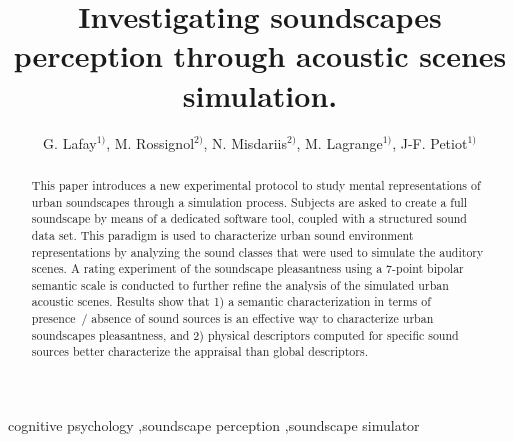 \documentclass[12pt]{elsarticle}
\begin{document}
\begin{frontmatter}


    \author{G. Lafay$^{1)}$, M. Rossignol$^{2)}$, N. Misdariis$^{2)}$, M. Lagrange$^{1)}$, J-F. Petiot$^{1)}$}

    \address{$^{1)}$ Laboratoire des Sciences du Numérique, Nantes, France.\\
    \hspace*{8pt}mathieu.lagrange@cnrs.fr\\
    $^{2)}$ STMS Ircam-CNRS-UPMC Institut de Recherche et Coordination Acoustique/Musique, Paris, France}


    \title{Investigating soundscapes perception through acoustic scenes simulation.}

  \begin{abstract}
    This paper introduces a new experimental protocol to study mental representations of urban soundscapes through a simulation process. Subjects are asked to create a full soundscape by means of a dedicated software tool, coupled with a structured sound data set. This paradigm is used to characterize urban sound environment representations by analyzing the sound classes that were used to simulate the auditory scenes. A rating experiment of the soundscape pleasantness using a 7-point bipolar semantic scale is conducted to further refine the analysis of the simulated urban acoustic scenes. Results show that 1) a semantic characterization in terms of presence~/ absence of sound sources is an effective way to characterize urban soundscapes pleasantness, and 2) physical descriptors computed for specific sound sources better characterize the appraisal than global descriptors.
  \end{abstract}

  \begin{keyword}
 cognitive psychology \sep soundscape perception \sep soundscape simulator


  \end{keyword}

\end{frontmatter}


\end{document}
